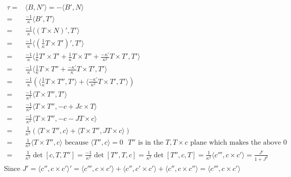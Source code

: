 \documentclass[12pt]{amsart}
\begin{document}
\begin{align*}
	\tau=&\langle B,N'\rangle=-\langle B',N\rangle
	\\=&\frac{-1}{\kappa}\langle B',T'\rangle
	\\=&\frac{-1}{\kappa}\langle (T\times N)',T'\rangle
	\\=&\frac{-1}{\kappa}\langle (\frac{1}{\kappa}T\times T')',T'\rangle
	\\=&\frac{-1}{\kappa}\langle \frac{1}{\kappa}T'\times T'+\frac{1}{\kappa}T\times T''+\frac{-\kappa'}{\kappa^2}T\times T',T'\rangle
	\\=&\frac{-1}{\kappa}\langle\frac{1}{\kappa}T\times T''+\frac{-\kappa'}{\kappa}T\times T',T'\rangle
	\\=&\frac{-1}{\kappa}\left(\langle\frac{1}{\kappa}T\times T'',T'\rangle+\langle\frac{-\kappa'}{\kappa^2}T\times T',T'\rangle\right)
	\\=&\frac{-1}{\kappa^2}\langle T\times T'',T'\rangle
	\\=&\frac{-1}{\kappa^2}\langle T\times T'',-c+Jc\times T\rangle
	\\=&\frac{-1}{\kappa^2}\langle T\times T'',-c-JT\times c\rangle
	\\=&\frac{1}{\kappa^2}\left(\langle T\times T'',c\rangle+\langle T\times T'',JT\times c\rangle\right)
	\\=&\frac{1}{\kappa^2}\langle T\times T'',c\rangle \text{ because }\langle T'',c\rangle=0 \text{ $T''$ is in the $T,T\times c$ plane which makes the above 0}
	\\=&\frac{1}{\kappa^2}\det [c,T,T'']=\frac{-1}{\kappa^2}\det [T'',T,c]=\frac{1}{\kappa^2}\det [T'',c,T]=\frac{1}{\kappa^2}\langle c''',c\times c'\rangle=\frac{J'}{1+J^2}
\end{align*}
Since $J'=\langle c'',c\times c'\rangle'=\langle c''',c\times c'\rangle+\langle c'',c'\times c'\rangle+\langle c'',c\times c''\rangle=\langle c''',c\times c'\rangle$
\end{document}
